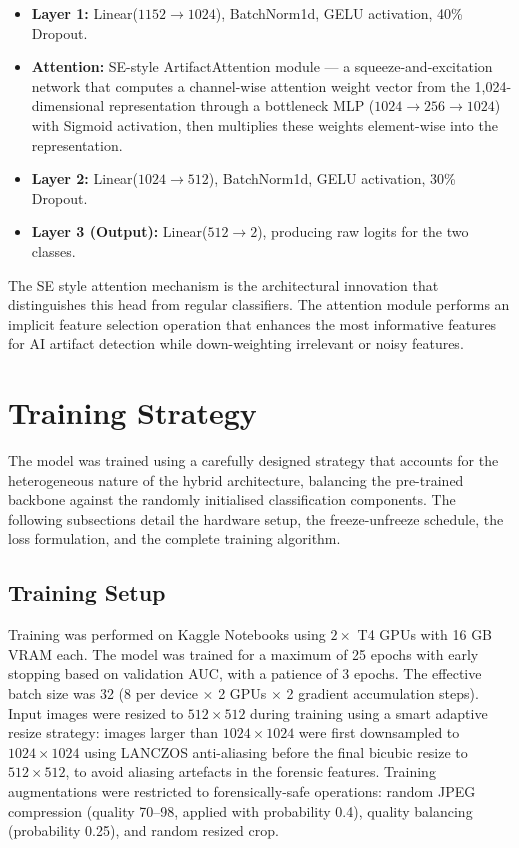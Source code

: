 \begin{itemize}
    \item \textbf{Layer 1:} Linear($1152 \rightarrow 1024$), BatchNorm1d, GELU activation, 40\% Dropout.
    \item \textbf{Attention:} SE-style ArtifactAttention module --- a squeeze-and-excitation network
    that computes a channel-wise attention weight vector from the 1,024-dimensional representation
    through a bottleneck MLP ($1024 \rightarrow 256 \rightarrow 1024$) with Sigmoid activation,
    then multiplies these weights element-wise into the representation.
    \item \textbf{Layer 2:} Linear($1024 \rightarrow 512$), BatchNorm1d, GELU activation, 30\% Dropout.
    \item \textbf{Layer 3 (Output):} Linear($512 \rightarrow 2$), producing raw logits for the two classes.
\end{itemize}

The SE style attention mechanism is the architectural innovation that distinguishes this head from regular classifiers. The attention module performs an implicit feature selection operation that enhances the most informative features for AI artifact detection while down-weighting irrelevant or noisy features.

\section{Training Strategy}

The model was trained using a carefully designed strategy that accounts for the heterogeneous nature of the hybrid architecture, balancing the pre-trained backbone against the randomly initialised classification components. The following subsections detail the hardware setup, the freeze-unfreeze schedule, the loss formulation, and the complete training algorithm.

\subsection{Training Setup}

Training was performed on Kaggle Notebooks using $2 \times$ T4 GPUs with 16 GB VRAM each. The model was trained for a maximum of 25 epochs with early stopping based on validation AUC, with a patience of 3 epochs. The effective batch size was 32 (8 per device $\times$ 2 GPUs $\times$ 2 gradient accumulation steps). Input images were resized to $512 \times 512$ during training using a smart adaptive resize strategy: images larger than $1024 \times 1024$ were first downsampled to $1024 \times 1024$ using LANCZOS anti-aliasing before the final bicubic resize to $512 \times 512$, to avoid aliasing artefacts in the forensic features. Training augmentations were restricted to forensically-safe operations: random JPEG compression (quality 70--98, applied with probability 0.4), quality balancing (probability 0.25), and random resized crop.

